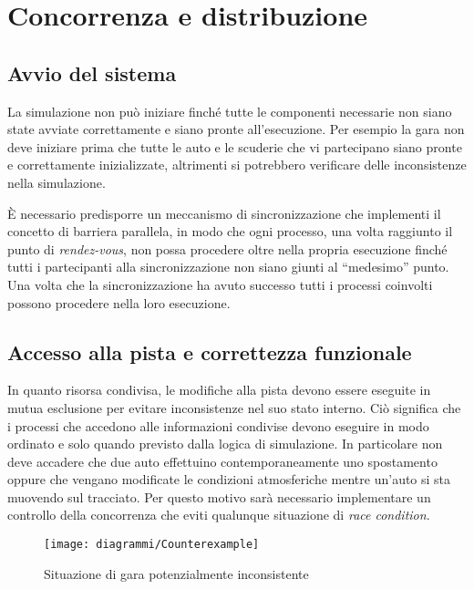 \section{Concorrenza e distribuzione}
\subsection*{Avvio del sistema}
La simulazione non può iniziare finché tutte le componenti necessarie non siano state avviate correttamente e siano pronte all'esecuzione. Per esempio la gara non deve iniziare prima che tutte le auto e le scuderie che vi partecipano siano pronte e correttamente inizializzate, altrimenti si potrebbero verificare delle inconsistenze nella simulazione.

\`E necessario predisporre un meccanismo di sincronizzazione che implementi il concetto di barriera parallela, in modo che ogni processo, una volta raggiunto il punto di \textsl{rendez-vous}, non possa procedere oltre nella propria esecuzione finché tutti i partecipanti alla sincronizzazione non siano giunti al ``medesimo'' punto. Una volta che la sincronizzazione ha avuto successo tutti i processi coinvolti possono procedere nella loro esecuzione.

\subsection*{Accesso alla pista e correttezza funzionale}
\label{sec:motivazioneSched}
In quanto risorsa condivisa, le modifiche alla pista devono essere eseguite in mutua esclusione per evitare inconsistenze nel suo stato interno. Ciò significa che i processi che accedono alle informazioni condivise devono eseguire in modo ordinato e solo quando previsto dalla logica di simulazione. In particolare non deve accadere che due auto effettuino contemporaneamente uno spostamento oppure che vengano modificate le condizioni atmosferiche mentre un'auto si sta muovendo sul tracciato. Per questo motivo sarà necessario implementare un controllo della concorrenza che eviti qualunque situazione di \textit{race condition}.

\begin{figure}
\begin{center}
\texttt{[image: diagrammi/Counterexample]}
\caption{Situazione di gara potenzialmente inconsistente}
\label{fig:counterexample}
\end{center}
\end{figure}

